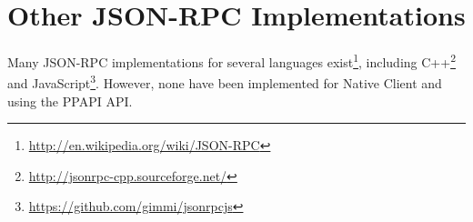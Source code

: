 \section{Other JSON-RPC Implementations} %
\label{sec:json_rpc_implementations}
Many JSON-RPC implementations for several languages exist\footnote{\url{http://en.wikipedia.org/wiki/JSON-RPC}}, including C++\footnote{\url{http://jsonrpc-cpp.sourceforge.net/}} and JavaScript\footnote{\url{https://github.com/gimmi/jsonrpcjs}}. However, none have been implemented for Native Client and using the PPAPI API.
